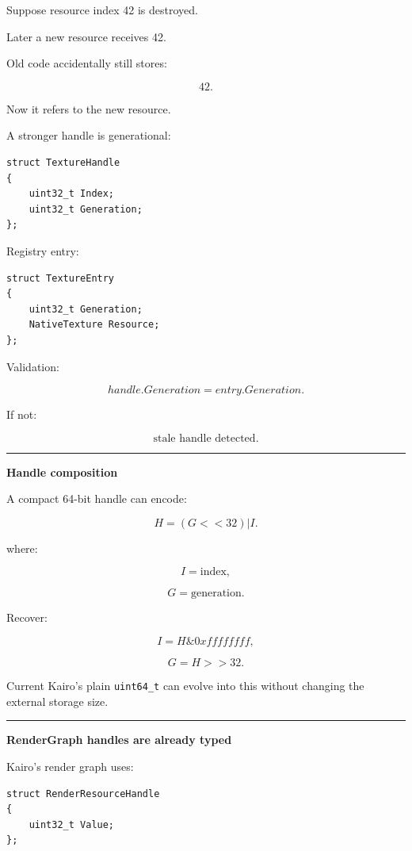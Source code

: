 Suppose resource index 42 is destroyed.

Later a new resource receives 42.

Old code accidentally still stores:

\[
42.
\]

Now it refers to the new resource.

A stronger handle is generational:

\begin{verbatim}
struct TextureHandle
{
    uint32_t Index;
    uint32_t Generation;
};
\end{verbatim}

Registry entry:

\begin{verbatim}
struct TextureEntry
{
    uint32_t Generation;
    NativeTexture Resource;
};
\end{verbatim}

Validation:

\[
handle.Generation
=
entry.Generation.
\]

If not:

\[
\boxed{\text{stale handle detected}.}
\]

\begin{center}\rule{0.5\linewidth}{0.5pt}\end{center}

\textbf{Handle composition}

A compact 64-bit handle can encode:

\[
H=
(G<<32)|I.
\]

where:

\[
I=\text{index},
\]

\[
G=\text{generation}.
\]

Recover:

\[
I=H\&0xffffffff,
\]

\[
G=H>>32.
\]

Current Kairo's plain \texttt{uint64\_t} can evolve into this without changing the external storage size.

\begin{center}\rule{0.5\linewidth}{0.5pt}\end{center}

\textbf{RenderGraph handles are already typed}

Kairo's render graph uses:

\begin{verbatim}
struct RenderResourceHandle
{
    uint32_t Value;
};
\end{verbatim}


